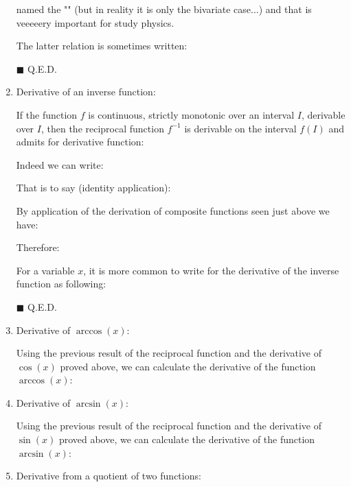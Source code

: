 \begin{enumerate}
\begin{dem}
			 named the "\label{multivariate chain rule}" (but in reality it is only the bivariate case...) and that is veeeeery important for study physics.
			 
			 The latter relation is sometimes written:
			 
		 	\begin{flushright}
			$\blacksquare$  Q.E.D.
			\end{flushright}
		 \end{dem}
		 
		 \item Derivative of an inverse function:
		 \begin{theorem}
		 	If the function $f$ is continuous, strictly monotonic over an interval $I$, derivable over $I$, then the reciprocal function $f^{-1}$ is derivable on the interval $f(I)$ and admits for derivative function:
		 	
		 \end{theorem}
		 \begin{dem}
		 	Indeed we can write:
		 	
		 	That is to say (identity application):
		 	
		 	By application of the derivation of composite functions seen just above we have:
		 	
		 	Therefore:
		 	
		 	For a variable $x$, it is more common to write for the derivative of the inverse function as following:
		 	
		 	\begin{flushright}
			$\blacksquare$  Q.E.D.
			\end{flushright}
		 \end{dem}
		 \item Derivative of $\arccos (x)$:
		 
		 	Using the previous result of the reciprocal function and the derivative of $\cos (x)$ proved above, we can calculate the derivative of the function $\arccos (x)$:
		 	
		 	\item Derivative of $\arcsin (x)$:
		 
		 	Using the previous result of the reciprocal function and the derivative of $\sin (x)$ proved above, we can calculate the derivative of the function $\arcsin (x)$:
		 	
		 	\item Derivative from a quotient of two functions:
		 	

\end{enumerate}
